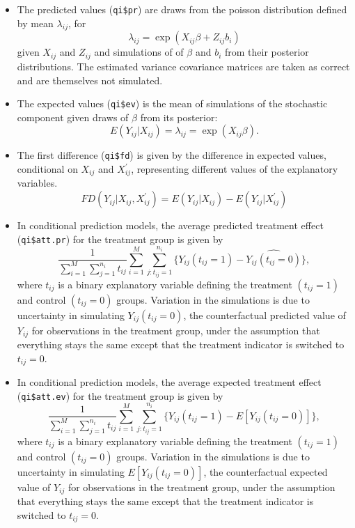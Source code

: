 \begin{itemize}
\item The predicted values ({\tt qi\$pr}) are draws from the poisson distribution defined by mean $ \lambda_{ij} $, for
\begin{equation*}
\lambda_{ij} = \exp(X_{ij} \beta + Z_{ij} b_i)
\end{equation*}
given $X_{ij}$ and $Z_{ij}$ and simulations of of $\beta$ and $b_i$ from their posterior distributions. The estimated variance covariance matrices are taken as correct and are themselves not simulated.

\item The expected values ({\tt qi\$ev}) is the mean of simulations of the stochastic component given draws of $\beta$ from its posterior:
\begin{equation*}
E(Y_{ij} | X_{ij}) = \lambda_{ij} = \exp(X_{ij} \beta).
\end{equation*}

\item The first difference ({\tt qi\$fd}) is given by the difference in expected values, conditional on $X_{ij}$ and $X_{ij}^\prime$, representing different values of the explanatory variables.
\begin{equation*}
FD(Y_{ij} | X_{ij}, X_{ij}^\prime) = E(Y_{ij} | X_{ij}) - E(Y_{ij} | X_{ij}^\prime)
\end{equation*}

\item In conditional prediction models, the average predicted treatment effect ({\tt qi\$att.pr}) for the treatment group is given by
\begin{equation*}
\frac{1}{\sum_{i = 1}^M \sum_{j = 1}^{n_i} t_{ij}} \sum_{i = 1}^M \sum_{j:t_{ij} = 1}^{n_i} \{ Y_{ij} (t_{ij} = 1) - \widehat{Y_{ij}(t_{ij} = 0)} \},
\end{equation*}
where $t_{ij}$ is a binary explanatory variable defining the treatment $(t_{ij} = 1)$ and control $(t_{ij} = 0)$ groups. Variation in the simulations is due to uncertainty in simulating $Y_{ij}(t_{ij} = 0)$, the counterfactual predicted value of $Y_{ij}$ for observations in the treatment group, under the assumption that everything stays the same except that the treatment indicator is switched to $t_{ij} = 0$.

\item In conditional prediction models, the average expected treatment effect ({\tt qi\$att.ev}) for the treatment group is given by
\begin{equation*}
\frac{1}{\sum_{i = 1}^M \sum_{j = 1}^{n_i} t_{ij}} \sum_{i = 1}^M \sum_{j:t_{ij} = 1}^{n_i} \{ Y_{ij} (t_{ij} = 1) - E[Y_{ij}(t_{ij} = 0)] \},
\end{equation*}
where $t_{ij}$ is a binary explanatory variable defining the treatment $(t_{ij} = 1)$ and control $(t_{ij} = 0)$ groups. Variation in the simulations is due to uncertainty in simulating $E[Y_{ij}(t_{ij} = 0)]$, the counterfactual expected value of $Y_{ij}$ for observations in the treatment group, under the assumption that everything stays the same except that the treatment indicator is switched to $t_{ij} = 0$.

\end{itemize}


